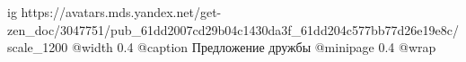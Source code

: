  
 
 
 
 

\ifcmt
  ig https://avatars.mds.yandex.net/get-zen_doc/3047751/pub_61dd2007cd29b04c1430da3f_61dd204c577bb77d26e19e8c/scale_1200
  @width 0.4
	@caption Предложение дружбы
  @minipage 0.4
  @wrap \parpic[r]
\fi
